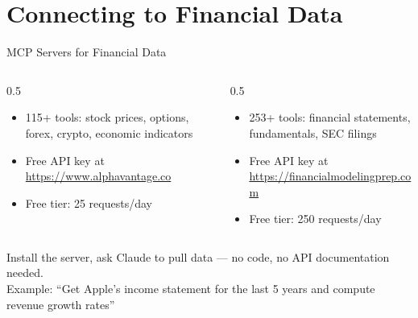 \documentclass[aspectratio=169]{beamer}
\begin{document}
\section{Connecting to Financial Data}

\begin{frame}[fragile]{MCP Servers for Financial Data}
\begin{columns}[T]
\begin{column}{0.5\textwidth}
\begin{shadedbox}[title=\textbf{Alpha Vantage}]
\begin{itemize}\small
  \item 115+ tools: stock prices, options, forex, crypto, economic indicators
  \item Free API key at \url{https://www.alphavantage.co}
  \item \alert{Free tier}: 25 requests/day
\end{itemize}
\end{shadedbox}
\end{column}
\begin{column}{0.5\textwidth}
\begin{shadedbox}[title=\textbf{Financial Modeling Prep}]
\begin{itemize}\small
  \item 253+ tools: financial statements, fundamentals, SEC filings
  \item Free API key at \url{https://financialmodelingprep.com}
  \item \alert{Free tier}: 250 requests/day
\end{itemize}
\end{shadedbox}
\end{column}
\end{columns}
\vspace{0.3cm}
\begin{center}\small
Install the server, ask Claude to pull data --- \alert{no code, no API documentation needed}.\\[0.3em]
Example: ``Get Apple's income statement for the last 5 years and compute revenue growth rates''
\end{center}
\end{frame}
\end{document}
